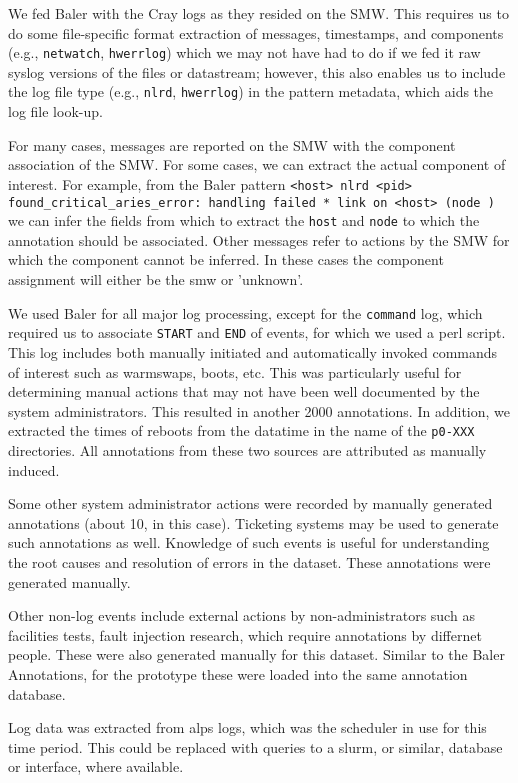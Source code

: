 We fed Baler with the Cray logs as they resided on the SMW. This requires us
to do some file-specific format extraction of messages, timestamps,
and components (e.g., \texttt{netwatch}, \texttt{hwerrlog}) which we may not have had to do if
we fed it raw syslog versions of the files or datastream; however, this also enables us
to include the log file type (e.g., \texttt{nlrd}, \texttt{hwerrlog}) in the pattern metadata,
which aids the log file look-up. 

For many cases, messages are reported
on the SMW with the component association of the SMW. For some cases, we can
extract the actual component of interest. For example, from the Baler pattern
\texttt{<host> nlrd <pid> found\_critical\_aries\_error: handling failed * link on <host> (node )}
we can infer the fields from which to extract the \texttt{host} and \texttt{node} to which
the annotation should be associated. Other messages refer to actions by the SMW for which
the component cannot be inferred. In these cases the component assignment will either be
the smw or 'unknown'.

We used Baler for all major log processing, except for the \texttt{command} log, which required us
to associate \texttt{START} and \texttt{END} of events, for which we used a perl script. This
log includes both manually initiated and automatically invoked commands of
interest such as warmswaps, boots, etc. This was particularly useful for
determining manual actions that may not have been well documented by the
system administrators. This resulted in another 2000 annotations. In addition,
we extracted the times of reboots from the datatime in the name of the \texttt{p0-XXX}
directories. All annotations from these two sources are attributed as manually induced.

Some other system administrator actions were recorded by manually generated annotations
(about 10, in this case). Ticketing systems may be used to generate such annotations as well.
Knowledge of such events is useful for understanding the root causes and resolution of errors
in the dataset. These annotations were generated manually.

Other non-log events include external actions by non-administrators
such as facilities tests, fault injection research, which require
annotations by differnet people. These were also generated manually
for this dataset. Similar to the Baler Annotations, for the
prototype these were loaded into the same annotation database.

Log data was extracted from alps logs, which was the scheduler in use for
this time period. This could be replaced with queries to a slurm,
or similar, database or interface, where available.

